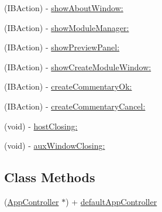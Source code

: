 \begin{DoxyCompactItemize}
\item 
(I\-B\-Action) -\/ \hyperlink{interface_app_controller_a4dcbdf721b023c9908336ba5ba996f78}{show\-About\-Window\-:}
\item 
(I\-B\-Action) -\/ \hyperlink{interface_app_controller_ad7000ea8fca0e24c3e154b905d5ccd8f}{show\-Module\-Manager\-:}
\item 
(I\-B\-Action) -\/ \hyperlink{interface_app_controller_a58014b22d1debc00ee0d1bb7c857d3fd}{show\-Preview\-Panel\-:}
\item 
(I\-B\-Action) -\/ \hyperlink{interface_app_controller_a12337c18445e066f08924a58b127116c}{show\-Create\-Module\-Window\-:}
\item 
(I\-B\-Action) -\/ \hyperlink{interface_app_controller_a2a65d82a2eba35796d006f2291157eb6}{create\-Commentary\-Ok\-:}
\item 
(I\-B\-Action) -\/ \hyperlink{interface_app_controller_ab1ce98642396211c903bf18aabd9ae47}{create\-Commentary\-Cancel\-:}
\item 
(void) -\/ \hyperlink{interface_app_controller_a29c13f7ff3ba193aae39edcaf91338c9}{host\-Closing\-:}
\item 
(void) -\/ \hyperlink{interface_app_controller_a6c2d6c7439fdc73485e88552e54c77dd}{aux\-Window\-Closing\-:}
\end{DoxyCompactItemize}
\subsection*{Class Methods}
\begin{DoxyCompactItemize}
\item 
(\hyperlink{interface_app_controller}{App\-Controller} $\ast$) + \hyperlink{interface_app_controller_ad0ca7dc8d747c27d2034326bc9d20d6c}{default\-App\-Controller}
\end{DoxyCompactItemize}
